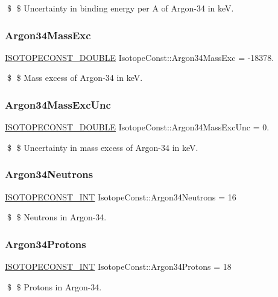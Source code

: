 \$ \$ Uncertainty in binding energy per A of Argon-\/34 in keV. \mbox{\label{group___isotope_const-_argon-_ar34_gabf060983df462367c20a3be853256e5d}} 
\subsubsection{\texorpdfstring{Argon34\+Mass\+Exc}{Argon34MassExc}}
{\footnotesize\ttfamily \mbox{\hyperlink{group___isotope_const-_macros_ga8f45a7272ce02c0b4c65c44636ed719a}{I\+S\+O\+T\+O\+P\+E\+C\+O\+N\+S\+T\+\_\+\+D\+O\+U\+B\+LE}} Isotope\+Const\+::\+Argon34\+Mass\+Exc = -\/18378.}

\$ \$ Mass excess of Argon-\/34 in keV. \mbox{\label{group___isotope_const-_argon-_ar34_ga6af3ce35169dcfce423c1d4ce83ef473}} 
\subsubsection{\texorpdfstring{Argon34\+Mass\+Exc\+Unc}{Argon34MassExcUnc}}
{\footnotesize\ttfamily \mbox{\hyperlink{group___isotope_const-_macros_ga8f45a7272ce02c0b4c65c44636ed719a}{I\+S\+O\+T\+O\+P\+E\+C\+O\+N\+S\+T\+\_\+\+D\+O\+U\+B\+LE}} Isotope\+Const\+::\+Argon34\+Mass\+Exc\+Unc = 0.}

\$ \$ Uncertainty in mass excess of Argon-\/34 in keV. \mbox{\label{group___isotope_const-_argon-_ar34_gaf0b1f6f8df25a63926a876ddef01b045}} 
\subsubsection{\texorpdfstring{Argon34\+Neutrons}{Argon34Neutrons}}
{\footnotesize\ttfamily \mbox{\hyperlink{group___isotope_const-_macros_ga5f18360b3e99483a35c32d789e62621c}{I\+S\+O\+T\+O\+P\+E\+C\+O\+N\+S\+T\+\_\+\+I\+NT}} Isotope\+Const\+::\+Argon34\+Neutrons = 16}

\$ \$ Neutrons in Argon-\/34. \mbox{\label{group___isotope_const-_argon-_ar34_ga07a77b8a1a742790435db54a765e1721}} 
\subsubsection{\texorpdfstring{Argon34\+Protons}{Argon34Protons}}
{\footnotesize\ttfamily \mbox{\hyperlink{group___isotope_const-_macros_ga5f18360b3e99483a35c32d789e62621c}{I\+S\+O\+T\+O\+P\+E\+C\+O\+N\+S\+T\+\_\+\+I\+NT}} Isotope\+Const\+::\+Argon34\+Protons = 18}

\$ \$ Protons in Argon-\/34. 